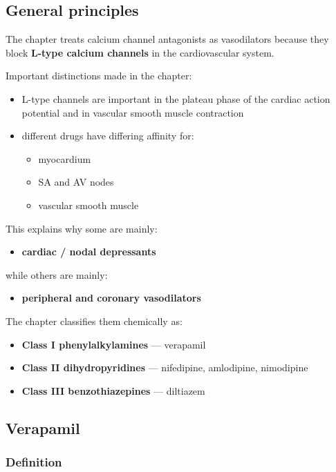 \documentclass[11pt,a4paper]{article}
\begin{document}
\subsection{General principles}

The chapter treats calcium channel antagonists as vasodilators because they block \textbf{L-type calcium channels} in the cardiovascular system.

Important distinctions made in the chapter:
\begin{itemize}
    \item L-type channels are important in the plateau phase of the cardiac action potential and in vascular smooth muscle contraction
    \item different drugs have differing affinity for:
    \begin{itemize}
        \item myocardium
        \item SA and AV nodes
        \item vascular smooth muscle
    \end{itemize}
\end{itemize}

This explains why some are mainly:
\begin{itemize}
    \item \textbf{cardiac / nodal depressants}
\end{itemize}
while others are mainly:
\begin{itemize}
    \item \textbf{peripheral and coronary vasodilators}
\end{itemize}

The chapter classifies them chemically as:
\begin{itemize}
    \item \textbf{Class I phenylalkylamines} --- verapamil
    \item \textbf{Class II dihydropyridines} --- nifedipine, amlodipine, nimodipine
    \item \textbf{Class III benzothiazepines} --- diltiazem
\end{itemize}

\subsection{Verapamil}

\subsubsection*{Definition}
\end{document}
